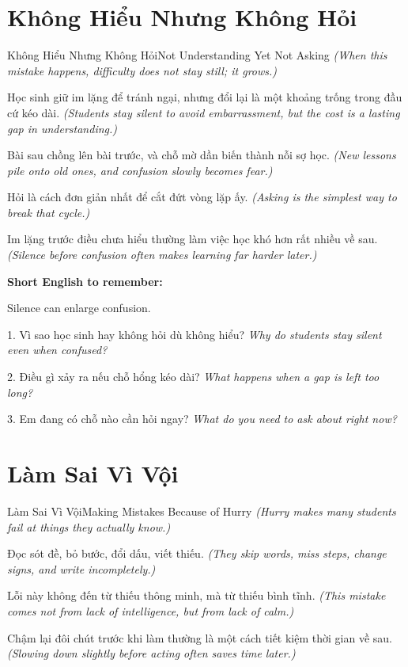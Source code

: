 \section{Không Hiểu Nhưng Không Hỏi}
\begin{truyen}{Không Hiểu Nhưng Không Hỏi}{Not Understanding Yet Not Asking}
\textit{(When this mistake happens, difficulty does not stay still; it grows.)}

Học sinh giữ im lặng để tránh ngại, nhưng đổi lại là một khoảng trống trong đầu cứ kéo dài.
\textit{(Students stay silent to avoid embarrassment, but the cost is a lasting gap in understanding.)}

Bài sau chồng lên bài trước, và chỗ mờ dần biến thành nỗi sợ học.
\textit{(New lessons pile onto old ones, and confusion slowly becomes fear.)}

Hỏi là cách đơn giản nhất để cắt đứt vòng lặp ấy.
\textit{(Asking is the simplest way to break that cycle.)}
\end{truyen}

\begin{baihoc}
Im lặng trước điều chưa hiểu thường làm việc học khó hơn rất nhiều về sau.
\textit{(Silence before confusion often makes learning far harder later.)}
\end{baihoc}

\begin{ghinhoanh}
\textbf{Short English to remember:}

Silence can enlarge confusion.

\end{ghinhoanh}

\begin{tuhocnhanh}
1. Vì sao học sinh hay không hỏi dù không hiểu? \textit{Why do students stay silent even when confused?}

2. Điều gì xảy ra nếu chỗ hổng kéo dài? \textit{What happens when a gap is left too long?}

3. Em đang có chỗ nào cần hỏi ngay? \textit{What do you need to ask about right now?}
\end{tuhocnhanh}
\ngancach

\section{Làm Sai Vì Vội}
\begin{truyen}{Làm Sai Vì Vội}{Making Mistakes Because of Hurry}
\textit{(Hurry makes many students fail at things they actually know.)}

Đọc sót đề, bỏ bước, đổi dấu, viết thiếu.
\textit{(They skip words, miss steps, change signs, and write incompletely.)}

Lỗi này không đến từ thiếu thông minh, mà từ thiếu bình tĩnh.
\textit{(This mistake comes not from lack of intelligence, but from lack of calm.)}

Chậm lại đôi chút trước khi làm thường là một cách tiết kiệm thời gian về sau.
\textit{(Slowing down slightly before acting often saves time later.)}
\end{truyen}

